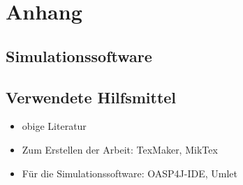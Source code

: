 \section*{Anhang}
\subsection*{Simulationssoftware}
\steffen

\subsection*{Verwendete Hilfsmittel}
\begin{itemize}
	\item obige Literatur
	\item Zum Erstellen der Arbeit: TexMaker, MikTex
	\item Für die Simulationssoftware: OASP4J-IDE, Umlet
\end{itemize}